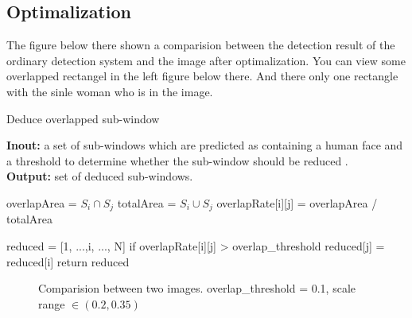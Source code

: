 \documentclass[a4paper, 11pt]{article} %
\begin{document}
\clearpage
\subsection{Optimalization}

    The figure below there shown a comparision between the detection result of the ordinary detection system and the image after optimalization. You can view some overlapped rectangel in the left figure below there. And there only one rectangle with the sinle woman who is in the image.

    \begin{algorithm}
        \caption{Deduce overlapped sub-window}

        \textbf{Inout:} a set of sub-windows which are predicted as containing a human face and a threshold to determine whether the sub-window should be reduced .\\
        \textbf{Output:} set of deduced sub-windows.
        \begin{algorithmic}
            \STATE    overlapArea = $S_{i} \cap S_{j}$
            \STATE    totalArea   = $S_{i} \cup S_{j}$
            \STATE    overlapRate[i][j] = overlapArea / totalArea
            \ENDFOR

        \ENDFOR
        \STATE reduced = [1, ...,i, ..., N]
            \STATE  if overlapRate[i][j] > overlap\_threshold
            \STATE      reduced[j] = reduced[i]
            \ENDFOR
        \ENDFOR
        \STATE return reduced
        \end{algorithmic}
    \end{algorithm}

    \begin{figure}[H]
        \centering
        \caption{Comparision between two images. overlap\_threshold = 0.1, scale range $\in (0.2, 0.35)$ }
    \end{figure}
\end{document}
